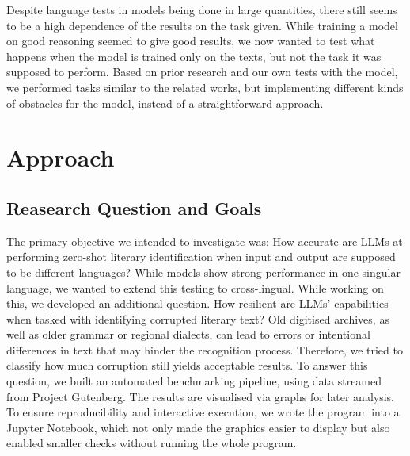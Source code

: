 \documentclass[11pt]{article}
\begin{document}
Despite language tests in models being done in large quantities, there still seems to be a high dependence of the results on the task given. While training a model on good reasoning seemed to give good results, we now wanted to test what happens when the model is trained only on the texts, but not the task it was supposed to perform. Based on prior research and our own tests with the model, we performed tasks similar to the related works, but implementing different kinds of obstacles for the model, instead of a straightforward approach. 

\section{Approach}
\subsection{Reasearch Question and Goals}
The primary objective we intended to investigate was: How accurate are LLMs at performing zero-shot literary identification when input and output are supposed to be different languages? While models show strong performance in one singular language, we wanted to extend this testing to cross-lingual. While working on this, we developed an additional question.  How resilient are LLMs' capabilities when tasked with identifying corrupted literary text? Old digitised archives, as well as older grammar or regional dialects, can lead to errors or intentional differences in text that may hinder the recognition process. Therefore, we tried to classify how much corruption still yields acceptable results. 
To answer this question, we built an automated benchmarking pipeline, using data streamed from Project Gutenberg. The results are visualised via graphs for later analysis. To ensure reproducibility and interactive execution, we wrote the program into a Jupyter Notebook, which not only made the graphics easier to display but also enabled smaller checks without running the whole program. 
\end{document}
